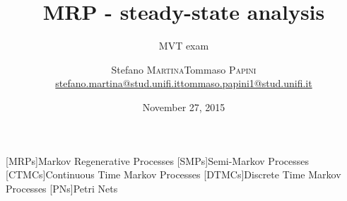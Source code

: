 





\title[\acs{MRP} steady-state]{\textbf{\acl{MRP} -
    steady-state analysis}}
\date[November 27, 2015]{\flushright November 27, 2015}
\subtitle{MVT exam}

\author[Martina - Papini]{
  \begin{center}
    \begin{tabular}{lr}
      Stefano \textsc{Martina}&Tommaso \textsc{Papini}\\
      \href{mailto:stefano.martina@stud.unifi.it}{stefano.martina@stud.unifi.it}&
      \href{mailto:tommaso.papini1@stud.unifi.it}{tommaso.papini1@stud.unifi.it}
    \end{tabular}
  \end{center}
}



[MRPs]{Markov Regenerative Processes}
[SMPs]{Semi-Markov Processes}
[CTMCs]{Continuous Time Markov Processes}
[DTMCs]{Discrete Time Markov Processes}
[PNs]{Petri Nets}

